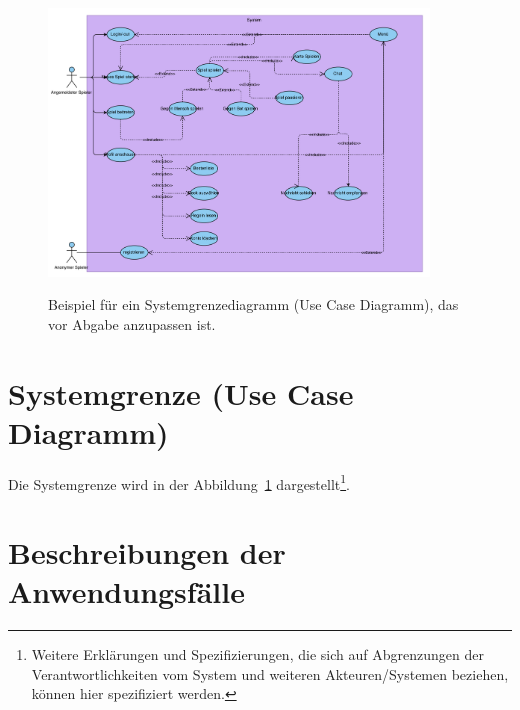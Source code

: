 \begin{figure}
\centering	
\includegraphics[width=0.9\textwidth]{img/UCD.jpg}
\label{fig:sys}
\caption{Beispiel für ein Systemgrenzediagramm (Use Case Diagramm), das vor Abgabe anzupassen ist.}
\end{figure}

\section{Systemgrenze (Use Case Diagramm)}

Die Systemgrenze wird in der Abbildung~\ref{fig:sys} dargestellt\footnote{Weitere Erklärungen und Spezifizierungen, die sich auf Abgrenzungen der Verantwortlichkeiten vom System und weiteren Akteuren/Systemen beziehen, können hier spezifiziert werden.}. 


\section{Beschreibungen der Anwendungsfälle}

\setcounter{uc}{10}

